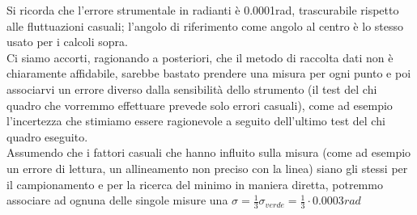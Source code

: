\documentclass[a4paper]{article}
\theoremstyle{definition}
\begin{document}
\begin{figure}[!htbp]
    	\captionsetup{labelformat=empty}

\end{figure}

\noindent Si ricorda che l'errore strumentale in radianti è 0.0001rad, trascurabile rispetto alle fluttuazioni casuali; l'angolo di riferimento come angolo al centro è lo stesso usato per i calcoli sopra. \\

Ci siamo accorti, ragionando a posteriori, che il metodo di raccolta dati non è chiaramente affidabile, sarebbe bastato prendere una misura per ogni punto e poi associarvi un errore diverso dalla sensibilità dello strumento (il test del chi quadro che vorremmo effettuare prevede solo errori casuali), come ad esempio l'incertezza che stimiamo essere ragionevole a seguito dell'ultimo test del chi quadro eseguito. \\
Assumendo che i fattori casuali che hanno influito sulla misura (come ad esempio un errore di lettura, un allineamento non preciso con la linea) siano gli stessi per il campionamento e per la ricerca del minimo in maniera diretta, potremmo associare ad ognuna delle singole misure una \(\sigma = \frac{1}{3}\sigma_{verde} = \frac{1}{3}\cdot 0.0003rad \)
\end{document}
